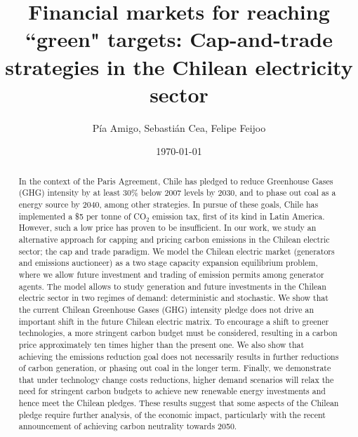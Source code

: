 \documentclass[11pt, letterpaper]{article}
\title{Financial markets for reaching ``green" targets: Cap-and-trade strategies in the Chilean electricity sector}
\author{P\'ia Amigo, Sebasti{\'a}n Cea, Felipe Feijoo}
\date{\today}
\begin{document}
\linenumbers
\maketitle

\begin{abstract}
In the context of the Paris Agreement, Chile has pledged to reduce Greenhouse Gases (GHG) intensity by at least 30\% below 2007 levels by 2030, and to phase out coal as a energy source by 2040, among other strategies. In pursue of these goals, Chile has implemented a \$5 per tonne of CO$_2$ emission tax, first of its kind in Latin America. However, such a low price has proven to be insufficient. In our work, we study an alternative approach for capping and pricing carbon emissions in the Chilean electric sector; the cap and trade paradigm. We model the Chilean electric market (generators and emissions auctioneer) as a two stage capacity expansion equilibrium problem, where we allow future investment and trading of emission permits among generator agents. The model allows to study generation and future investments in the Chilean electric sector in two regimes of demand: deterministic and stochastic. We show that the current Chilean Greenhouse Gases (GHG) intensity pledge does not drive an important shift in the future Chilean electric matrix. To encourage a shift to greener technologies, a more stringent carbon budget must be considered, resulting in a carbon price approximately ten times higher than the present one. We also show that achieving the emissions reduction goal does not necessarily results in further reductions of carbon generation, or phasing out coal in the longer term. Finally, we demonstrate that under technology change costs reductions, higher demand scenarios will relax the need for stringent carbon budgets to achieve new renewable energy investments and hence meet the Chilean pledges. These results suggest that some aspects of the Chilean pledge require further analysis, of the economic impact, particularly with the recent announcement of achieving carbon neutrality towards 2050. 
\end{abstract}
\end{document}

